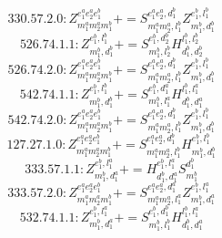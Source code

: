 \documentclass[letterpaper,10pt,fleqn,leqno,onecolumn]{article}
\begin{document}
\begin{equation} \;\;\;\;\;\;  330.57.2.0: Z^{e_{1}^{a}e_{2}^{a}e_{1}^{b}}_{m_{1}^{a}m_{2}^{a}m_{1}^{b}}+=S^{e_{1}^{a}e_{2}^{a},d_{1}^{b}}_{m_{1}^{a}m_{2}^{a},l_{1}^{b}}Z^{e_{1}^{b},l_{1}^{b}}_{m_{1}^{b},d_{1}^{b}} \end{equation}
\begin{equation} \;\;\;\;\;\;  526.74.1.1: Z^{e_{1}^{b},l_{1}^{b}}_{m_{1}^{b},d_{1}^{b}}+=S^{e_{1}^{b},d_{2}^{b}}_{m_{1}^{b},l_{2}^{b}}H^{l_{1}^{b},l_{2}^{b}}_{d_{1}^{b},d_{2}^{b}} \end{equation}
\begin{equation} \;\;\;\;\;\;  526.74.2.0: Z^{e_{1}^{a}e_{2}^{a}e_{1}^{b}}_{m_{1}^{a}m_{2}^{a}m_{1}^{b}}+=S^{e_{1}^{a}e_{2}^{a},d_{1}^{b}}_{m_{1}^{a}m_{2}^{a},l_{1}^{b}}Z^{e_{1}^{b},l_{1}^{b}}_{m_{1}^{b},d_{1}^{b}} \end{equation}
\begin{equation} \;\;\;\;\;\;  542.74.1.1: Z^{e_{1}^{b},l_{1}^{b}}_{m_{1}^{b},d_{1}^{b}}+=S^{e_{1}^{b},d_{1}^{a}}_{m_{1}^{b},l_{1}^{a}}H^{l_{1}^{b},l_{1}^{a}}_{d_{1}^{b},d_{1}^{a}} \end{equation}
\begin{equation} \;\;\;\;\;\;  542.74.2.0: Z^{e_{1}^{a}e_{2}^{a}e_{1}^{b}}_{m_{1}^{a}m_{2}^{a}m_{1}^{b}}+=S^{e_{1}^{a}e_{2}^{a},d_{1}^{b}}_{m_{1}^{a}m_{2}^{a},l_{1}^{b}}Z^{e_{1}^{b},l_{1}^{b}}_{m_{1}^{b},d_{1}^{b}} \end{equation}
\begin{equation} \;\;\;\;\;\;  127.27.1.0: Z^{e_{1}^{a}e_{2}^{a}e_{1}^{b}}_{m_{1}^{a}m_{2}^{a}m_{1}^{b}}+=S^{e_{1}^{a}e_{2}^{a},d_{1}^{b}}_{m_{1}^{a}m_{2}^{a},l_{1}^{b}}H^{e_{1}^{b},l_{1}^{b}}_{m_{1}^{b},d_{1}^{b}} \end{equation}
\begin{equation} \;\;\;\;\;\;  333.57.1.1: Z^{e_{1}^{b},l_{1}^{a}}_{m_{1}^{b},d_{1}^{a}}+=H^{e_{1}^{b},l_{1}^{a}}_{d_{1}^{b},d_{1}^{a}}S^{d_{1}^{b}}_{m_{1}^{b}} \end{equation}
\begin{equation} \;\;\;\;\;\;  333.57.2.0: Z^{e_{1}^{a}e_{2}^{a}e_{1}^{b}}_{m_{1}^{a}m_{2}^{a}m_{1}^{b}}+=S^{e_{1}^{a}e_{2}^{a},d_{1}^{a}}_{m_{1}^{a}m_{2}^{a},l_{1}^{a}}Z^{e_{1}^{b},l_{1}^{a}}_{m_{1}^{b},d_{1}^{a}} \end{equation}
\begin{equation} \;\;\;\;\;\;  532.74.1.1: Z^{e_{1}^{b},l_{1}^{a}}_{m_{1}^{b},d_{1}^{a}}+=S^{e_{1}^{b},d_{1}^{b}}_{m_{1}^{b},l_{1}^{b}}H^{l_{1}^{b},l_{1}^{a}}_{d_{1}^{b},d_{1}^{a}} \end{equation}
\end{document}
